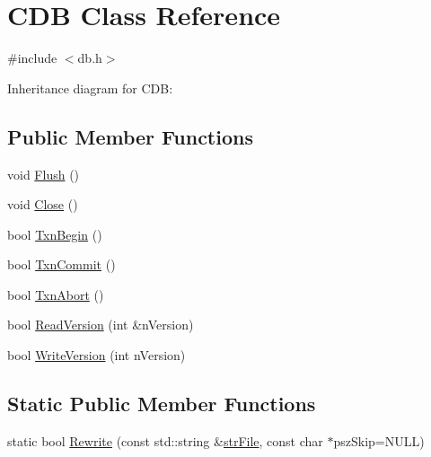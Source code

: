 \hypertarget{class_c_d_b}{}\section{C\+D\+B Class Reference}
\label{class_c_d_b}


{\ttfamily \#include $<$db.\+h$>$}



Inheritance diagram for C\+D\+B\+:
\subsection*{Public Member Functions}
\begin{DoxyCompactItemize}
\item 
void \hyperlink{class_c_d_b_ab4a0447a8d19b4871b9fcc40edee9480}{Flush} ()
\item 
void \hyperlink{class_c_d_b_af8bbf106662d67cdfdd6d58c429bc54b}{Close} ()
\item 
bool \hyperlink{class_c_d_b_a6f817da7947e1498e44034b7a1c8ac10}{Txn\+Begin} ()
\item 
bool \hyperlink{class_c_d_b_a45061b3e71251dc74ddd868afb760590}{Txn\+Commit} ()
\item 
bool \hyperlink{class_c_d_b_af9b0924f1ca98e0544e78e9bb58b4f03}{Txn\+Abort} ()
\item 
bool \hyperlink{class_c_d_b_a16f591e27f41397570018c1fae084025}{Read\+Version} (int \&n\+Version)
\item 
bool \hyperlink{class_c_d_b_aa3e63c0921af4c6fc92def1ba14500f1}{Write\+Version} (int n\+Version)
\end{DoxyCompactItemize}
\subsection*{Static Public Member Functions}
\begin{DoxyCompactItemize}
\item 
static bool \hyperlink{class_c_d_b_acfb8a373edb9c4cfab780fb7578b277e}{Rewrite} (const std\+::string \&\hyperlink{class_c_d_b_a15c6112d9db9dcc5f11a2c05d9aa74a5}{str\+File}, const char $\ast$psz\+Skip=N\+U\+L\+L)
\end{DoxyCompactItemize}
